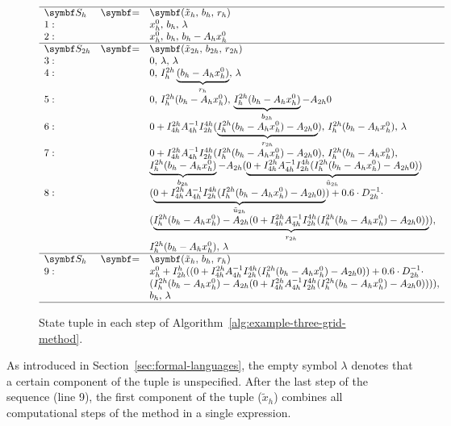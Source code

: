 \begin{figure}
	\begin{equation*}
		\begin{array}{l l l}
			\hline
			\bm{S_h} & \bm{=} & \bm{(\tilde{x}_h, \, b_h, \, r_h)}  \\
			1: & &  x_{h}^0, \, b_h, \, \lambda \\
			2: & &  x_{h}^0, \, b_h, \, b_{h} - A_h x_{h}^0 \\ \hline
			\bm{S_{2h}} & \bm{=} &  \bm{(\tilde{x}_{2h}, \, b_{2h}, \, r_{2h})} \\
			3: & &  0, \, \lambda, \, \lambda \\
			4: & &  0, \, I_{h}^{2h}\underbrace{(b_{h} - A_h x_{h}^0)}_{r_{h}}, \, \lambda \\
			5: & &  0, \, I_{h}^{2h}(b_{h} - A_h x_{h}^0), \,\underbrace{I_{h}^{2h}(b_{h} - A_h x_{h}^0)}_{b_{2h}} - A_{2h} 0 \\
			6: & & 0 + I_{4h}^{2h} A_{4h}^{-1} I_{2h}^{4h} (\underbrace{I_{h}^{2h}(b_{h} - A_h x_{h}^0) - A_{2h} 0}_{r_{2h}}), \, I_{h}^{2h}(b_{h} - A_h x_{h}^0), \, \lambda\\
			7: & & 0 + I_{4h}^{2h} A_{4h}^{-1} I_{2h}^{4h} (I_{h}^{2h}(b_{h} - A_h x_{h}^0) - A_{2h} 0), \, I_{h}^{2h}(b_{h} - A_h x_{h}^0), \\ 
			& &  \underbrace{I_{h}^{2h}(b_{h} - A_h x_{h}^0)}_{b_{2h}} - A_{2h} (\underbrace{0 + I_{4h}^{2h} A_{4h}^{-1} I_{2h}^{4h} (I_{h}^{2h}(b_{h} - A_h x_{h}^0) - A_{2h} 0)}_{\tilde{u}_{2h}}) \\
			8: & &   (\underbrace{0 + I_{4h}^{2h} A_{4h}^{-1} I_{2h}^{4h} (I_{h}^{2h}(b_{h} - A_h x_{h}^0) - A_{2h} 0)}_{\tilde{u}_{2h}}) + 0.6 \cdot D_{2h}^{-1} \cdot \\ 
			& & (\underbrace{I_{h}^{2h}(b_{h} - A_h x_{h}^0) - A_{2h} (0 + I_{4h}^{2h} A_{4h}^{-1} I_{2h}^{4h} (I_{h}^{2h}(b_{h} - A_h x_{h}^0) - A_{2h} 0))}_{r_{2h}}), \\ 
			& & I_{h}^{2h}(b_{h} - A_h x_{h}^0), \, \lambda \\ \hline 
			\bm{S_h} & \bm{=} & \bm{(\tilde{x}_h, \, b_h, \, r_h)}  \\
			9: & & x_{h}^0 + I_{2h}^h ((0 + I_{4h}^{2h} A_{4h}^{-1} I_{2h}^{4h} (I_{h}^{2h}(b_{h} - A_h x_{h}^0) - A_{2h} 0)) + 0.6 \cdot D_{2h}^{-1} \cdot \\ 
			& &  (I_{h}^{2h}(b_{h} - A_h x_{h}^0) - A_{2h} (0 + I_{4h}^{2h} A_{4h}^{-1} I_{2h}^{4h} (I_{h}^{2h}(b_{h} - A_h x_{h}^0) - A_{2h} 0)))), \\ 
			& &  b_h, \, \lambda \\
			\hline
		\end{array}
	\end{equation*}
	\caption{State tuple in each step of Algorithm~\ref{alg:example-three-grid-method}.}
	\label{fig:example-tree-grid-method-states}
\end{figure}
As introduced in Section~\ref{sec:formal-languages}, the empty symbol $\lambda$ denotes that a certain component of the tuple is unspecified.
After the last step of the sequence (line 9), the first component of the tuple ($\tilde{x}_h$) combines all computational steps of the method in a single expression.

